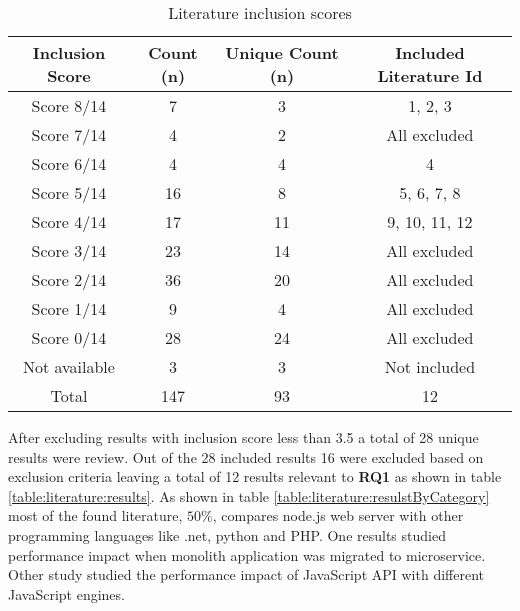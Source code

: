 \begin{table}[ht!]
    \begin{tabular}{|c c c c|} 
        \hline
        Inclusion Score
        & Count (n)
        & Unique Count (n)
        & Included Literature Id
        \\ 
        \hline\hline
        Score 8/14
        & 7
        & 3
        & 1, 2, 3
        \\ 
        
        Score 7/14
        & 4
        & 2
        & All excluded
        \\ 
        
        Score 6/14
        & 4
        & 4
        & 4
        \\ 
        
        Score 5/14
        & 16
        & 8
        & 5, 6, 7, 8
        \\ 
        
        Score 4/14
        & 17
        & 11
        & 9, 10, 11, 12
        \\ 
        
        Score 3/14
        & 23
        & 14
        & All excluded
        \\ 
        
        Score 2/14
        & 36
        & 20
        & All excluded
        \\ 
        
        Score 1/14
        & 9
        & 4
        & All excluded
        \\ 
        
        Score 0/14
        & 28
        & 24
        & All excluded
        \\ 
        
        Not available
        & 3
        & 3
        & Not included
        \\ 
        \hline
        Total
        & 147
        & 93
        & 12
        \\ 
        \hline
    \end{tabular}    
    \caption{Literature inclusion scores}
    \label{table:literature:inclusionResults}
\end{table}
After excluding results with inclusion score less than 3.5 a total of 28 unique results were review.
Out of the 28 included results 16 were excluded based on exclusion criteria leaving a total of 12 results relevant to \textbf{RQ1} as shown in table \ref{table:literature:results}.
As shown in table \ref{table:literature:resulstByCategory} most of the found literature, $50\%$, compares node.js web server with other programming languages like .net, python and PHP.
One results studied performance impact when monolith application was migrated to microservice.
Other study studied the performance impact of JavaScript API with different JavaScript engines.

